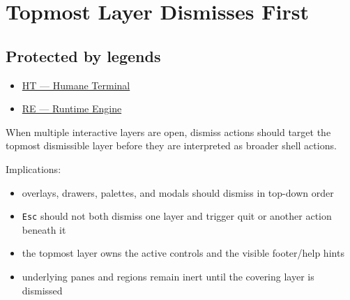 \chapter{Topmost Layer Dismisses First}\label{record-062}

\smallskip

\section{Protected by legends}\label{record-062-protected-by-legends}

\begin{itemize}
\tightlist
\item
  \href{https://github.com/flyingrobots/bijou/blob/1853ad902f6bf219326409e7f743a5a1d6517dbc/docs/legends/HT-humane-terminal.md}{HT --- Humane Terminal}
\item
  \href{https://github.com/flyingrobots/bijou/blob/1853ad902f6bf219326409e7f743a5a1d6517dbc/docs/legends/RE-runtime-engine.md}{RE --- Runtime Engine}
\end{itemize}

When multiple interactive layers are open, dismiss actions should target the topmost dismissible layer before they are interpreted as broader shell actions.

Implications:

\begin{itemize}
\tightlist
\item
  overlays, drawers, palettes, and modals should dismiss in top-down order
\item
  \texttt{E\allowbreak{}s\allowbreak{}c} should not both dismiss one layer and trigger quit or another action beneath it
\item
  the topmost layer owns the active controls and the visible footer/help hints
\item
  underlying panes and regions remain inert until the covering layer is dismissed
\end{itemize}

